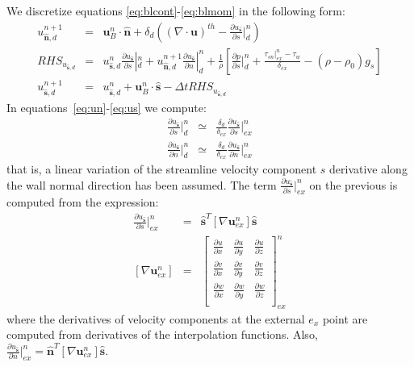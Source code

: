 \documentclass[12pt]{article}
\begin{document}
We discretize equations \eqref{eq:blcont}-\eqref{eq:blmom} in the following form:
%
\begin{eqnarray}
   u_{\hat{\mathbf{n}},d}^{n+1} &=& \mathbf{u}_{B}^n \cdot \hat{\mathbf{n}} + \delta_d \left(  \left( \nabla \cdot \mathbf{u} \right)^{th}  
   - \frac{\partial u_{\hat{\mathbf{s}}} }{\partial s} |_{d}^n \right) \label{eq:un} \\
   RHS_{u_{\hat{\mathbf{s}},d}} &=&  u_{\hat{\mathbf{s}},d}^n  \frac{\partial u_{\hat{\mathbf{s}}} }{\partial s} |_{d}^n  +
   u_{\hat{\mathbf{n}},d}^{n+1} \frac{\partial u_{\hat{\mathbf{s}}} }{\partial n} |_{d}^n +
   \frac{1}{\rho} \left[  \frac{\partial p}{\partial s} |_d^n + \frac{\tau_{sn} |_{ex}^n - \tau_w}{\delta_{ex}} - (\rho-\rho_0) g_s \right] \label{eq:rhsus} \\
   u_{\hat{\mathbf{s}},d}^{n+1} &=& u_{\hat{\mathbf{s}},d}^{n}+\mathbf{u}_{B}^n \cdot \hat{\mathbf{s}} - \Delta t RHS_{u_{\hat{\mathbf{s}},d}} \label{eq:us}
\end{eqnarray}
%
In equations~\eqref{eq:un}-\eqref{eq:us} we compute: 
%
\begin{eqnarray}
   \frac{\partial u_{\hat{\mathbf{s}}} }{\partial s} |_{d}^n &\simeq& \frac{ \delta_d}{ \delta_{ex}} \frac{\partial u_{\hat{\mathbf{s}}} }{\partial s} |_{ex}^n \\
    \frac{\partial u_{\hat{\mathbf{s}}} }{\partial n} |_{d}^n &\simeq& \frac{ \delta_d}{ \delta_{ex}} \frac{\partial u_{\hat{\mathbf{s}}} }{\partial n} |_{ex}^n
\end{eqnarray}
%
that is, a linear variation of the streamline velocity component $s$ derivative along the wall normal direction has been assumed.
The term $\frac{\partial u_{\hat{\mathbf{s}}} }{\partial s} |_{ex}^n$ on the previous is computed from the expression:
%
\begin{eqnarray}
   \frac{\partial u_{\hat{\mathbf{s}}} }{\partial s} |_{ex}^n &=& \hat{\mathbf{s}}^T \left[ \nabla \mathbf{u}_{ex}^n \right]  \hat{\mathbf{s}} \\
   \left[ \nabla \mathbf{u}_{ex}^n \right] &=& \begin{bmatrix}
   \frac{\partial u}{\partial x} & \frac{\partial u}{\partial y} & \frac{\partial u}{\partial z} \\
   \frac{\partial v}{\partial x} & \frac{\partial v}{\partial y} & \frac{\partial v}{\partial z} \\
   \frac{\partial w}{\partial x} & \frac{\partial w}{\partial y} & \frac{\partial w}{\partial z} \\
   \end{bmatrix}_{ex}^n
\end{eqnarray}
%
where the derivatives of velocity components at the external $e_x$ point are computed from derivatives of the interpolation functions. Also,  $\frac{\partial u_{\hat{\mathbf{s}}} }{\partial n} |_{ex}^n=\hat{\mathbf{n}}^T \left[ \nabla \mathbf{u}_{ex}^n \right]  \hat{\mathbf{s}}$.
\end{document}
